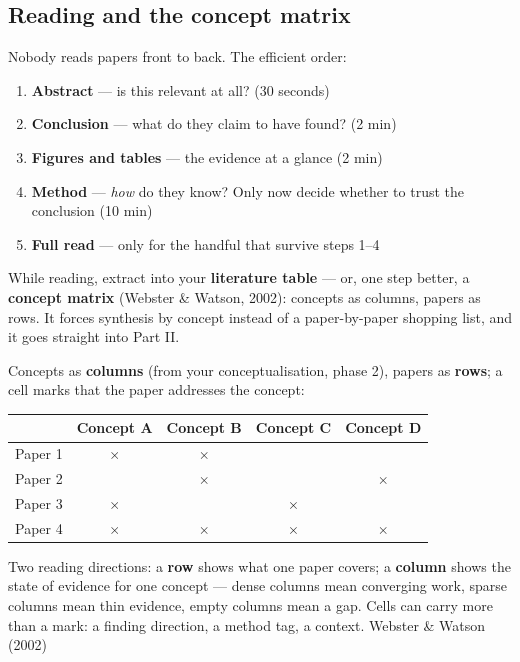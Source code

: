 \documentclass[11pt,a4paper,british,twoside=false,headings=small,chapterprefix=false,numbers=noenddot]{scrbook}
\begin{document}
\subsection{Reading and the concept matrix}
\begin{center}\small
Nobody reads papers front to back. The efficient order:
  
  \begin{enumerate}\setlength{\itemsep}{0.4em}
    \item \textbf{Abstract} --- is this relevant at all? (30 seconds)
    \item \textbf{Conclusion} --- what do they claim to have found? (2 min)
    \item \textbf{Figures and tables} --- the evidence at a glance (2 min)
    \item \textbf{Method} --- \emph{how} do they know? Only now decide whether
          to trust the conclusion (10 min)
    \item \textbf{Full read} --- only for the handful that survive steps 1--4
  \end{enumerate}
  
  While reading, extract into your \textbf{literature table} --- or, one
  step better, a \textbf{concept matrix} (Webster \& Watson, 2002): concepts
  as columns, papers as rows. It forces synthesis by concept instead of a
  paper-by-paper shopping list, and it goes straight into Part II.
\end{center}

\begin{center}\small
Concepts as \textbf{columns} (from your conceptualisation, phase 2),
  papers as \textbf{rows}; a cell marks that the paper addresses the concept:
  
  \footnotesize
  \renewcommand{\arraystretch}{1.35}
  \begin{tabular}{@{}p{3.0cm}cccc@{}}
    \toprule
    & \textbf{Concept A} & \textbf{Concept B} & \textbf{Concept C} & \textbf{Concept D}\\
    \midrule
    Paper 1 & $\times$ & $\times$ &          & \\
    Paper 2 &          & $\times$ &          & $\times$\\
    Paper 3 & $\times$ &          & $\times$ & \\
    Paper 4 & $\times$ & $\times$ & $\times$ & $\times$\\
    \bottomrule
  \end{tabular}
  

  Two reading directions: a \textbf{row} shows what one paper covers; a
  \textbf{column} shows the state of evidence for one concept --- dense
  columns mean converging work, sparse columns mean thin evidence, empty
  columns mean a gap. Cells can carry more than a mark: a finding direction,
  a method tag, a context.
  \hfill {\color{kgrey}\scriptsize Webster \& Watson (2002)}
\end{center}
\end{document}
